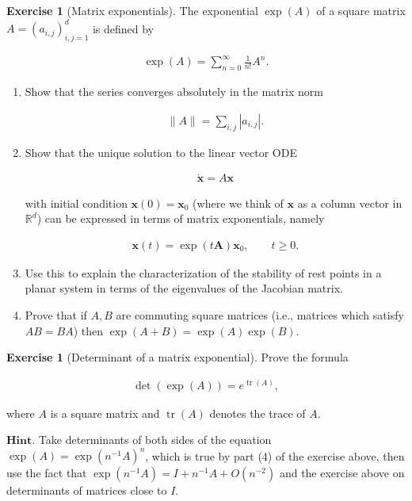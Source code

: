 \documentclass[11pt]{report}
\theoremstyle{plain}
\theoremstyle{definition}
\newtheorem{xexercise}[thm]{Exercise}
\begin{document}
\begin{xexercise}[Matrix exponentials]
The exponential $\exp(A)$ of a square matrix
$A=(a_{i,j})_{i,j=1}^d$ is defined by

\begin{align*}
\exp(A) = \sum_{n=0}^\infty \frac{1}{n!} A^n.
\end{align*}

\begin{enumerate}[label=\arabic*.]
\item Show that the series converges absolutely in the
matrix norm

\begin{align*}
\lVert A \rVert = \sum_{i,j} |a_{i,j}|.
\end{align*}

\item Show that the unique solution to the linear vector
ODE

\begin{align*}
\dot{\mathbf{x}} = A \mathbf{x}
\end{align*}

with initial condition $\mathbf{x}(0) = \mathbf{x}_0$
(where we think of $\mathbf{x}$ as a column vector in
$\mathbb{R}^d$) can be expressed in terms of matrix
exponentials, namely

\begin{align*}
\mathbf{x}(t) = \exp\left(t \mathbf{A}\right) \mathbf{x}_0, \qquad t\ge 0.
\end{align*}

\item Use this to explain the characterization of the
stability of rest points in a planar system in terms
of the eigenvalues of the Jacobian matrix.

\item Prove that if $A, B$ are commuting square matrices
(i.e., matrices which satisfy $AB=BA$) then
$\exp(A+B)=\exp(A)\exp(B)$.
\end{enumerate}

\end{xexercise}

\begin{xexercise}[Determinant of a matrix exponential]
Prove the formula

\begin{align*}
\det\left( \exp(A)\right) = e^{\operatorname{tr}(A)},
\end{align*}

where $A$ is a square matrix and
$\operatorname{tr}(A)$ denotes the trace of $A$.

$\textbf{Hint.}$ Take determinants of both sides of
the equation $\exp(A)=\exp(n^{-1} A)^n$, which is
true by part (4) of the exercise above, then use the
fact that $\exp(n^{-1} A)=I+n^{-1}A + O(n^{-2})$ and
the exercise above on determinants of matrices close
to $I$.
\end{xexercise}
\end{document}
